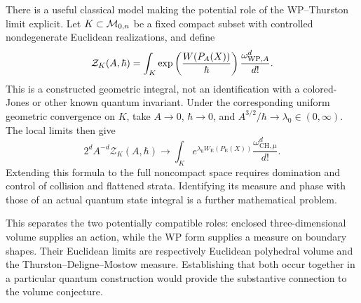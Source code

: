 There is a useful classical model making the potential role of
 the WP--Thurston limit explicit. Let $K\subset\mathcal M_{0,n}$ be a
 fixed compact subset with controlled nondegenerate Euclidean
 realizations, and define
\begin{equation}
 \mathcal Z_K(A,\hbar)=\int_K
       \exp\left(\frac{W(P_A(X))}{\hbar}\right)
       \frac{\omega_{\mathrm{WP},A}^d}{d!}.
 \label{eq:modelpartition}
\end{equation}
This is a constructed geometric integral, not an identification
with a colored-Jones or other known quantum invariant. Under the
corresponding uniform geometric convergence on $K$, take
$A\to0$, $\hbar\to0$, and $A^{3/2}/\hbar\to\lambda_0\in(0,\infty)$.
The local limits then give
\begin{equation}
 2^d A^{-d}\mathcal Z_K(A,\hbar)\longrightarrow
 \int_K e^{\lambda_0 W_{\mathrm E}(P_{\mathrm E}(X))}
                 \frac{\omega_{\mathrm{CH},\mu}^d}{d!}.
 \label{eq:modelpartitionlimit}
\end{equation}
Extending this formula to the full noncompact space requires
 domination and control of collision and flattened strata.
 Identifying its measure and phase with those of an actual quantum
 state integral is a further mathematical problem.

This separates the two potentially compatible roles: enclosed
three-dimensional volume supplies an action, while the WP form
supplies a measure on boundary shapes. Their Euclidean limits
are respectively Euclidean polyhedral volume and the
Thurston--Deligne--Mostow measure. Establishing that both occur
together in a particular quantum construction would provide the
substantive connection to the volume conjecture.


